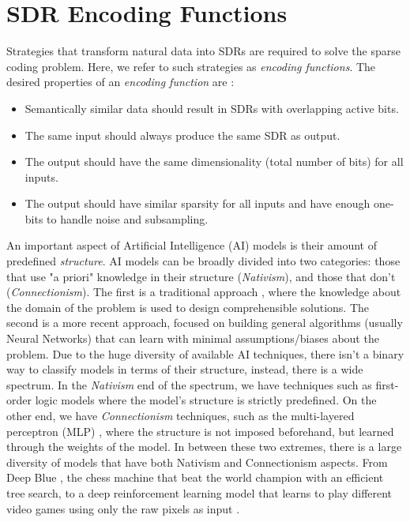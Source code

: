 \documentclass{article}
\begin{document}
\section{SDR Encoding Functions}
\label{SDRgen}

Strategies that transform natural data into SDRs are required to solve the sparse
coding problem. Here, we refer to such strategies as \textit{encoding functions}.
The desired properties of an \textit{encoding function} are \cite{Hawkins-et-al-2016-Book}:
\begin{itemize}
    \item Semantically similar data should result in SDRs with overlapping active bits.
    \item The same input should always produce the same SDR as output.
    \item The output should have the same dimensionality (total number of bits) for all inputs.
    \item The output should have similar sparsity for all inputs and have enough one-bits to handle noise and subsampling.
\end{itemize}

An important aspect of Artificial Intelligence (AI) models is their amount of predefined \textit{structure}. AI models can be broadly divided into two categories: those that use "a priori" knowledge in their structure (\textit{Nativism}), and those that don't (\textit{Connectionism}).
The first is a traditional approach \cite{newell2007computer}, where the knowledge about the domain of the problem is used to design comprehensible solutions.
The second is a more recent approach, focused on building general algorithms (usually Neural Networks) that can learn with minimal assumptions/biases about the problem.
Due to the huge diversity of available AI techniques, there isn't a binary way to classify models in terms of their structure, instead, there is a wide spectrum.
In the \textit{Nativism} end of the spectrum, we have techniques such as first-order logic models \cite{mitchell1997machine} where the model's structure is strictly predefined.
On the other end, we have \textit{Connectionism} techniques, such as the multi-layered perceptron (MLP) \cite{hornik1989multilayer}, where the structure is not imposed beforehand, but learned through the weights of the model.
In between these two extremes, there is a large diversity of models that have both Nativism and Connectionism aspects. From Deep Blue \cite{campbell2002deep}, the chess machine that beat the world champion with an efficient tree search, to a deep reinforcement learning model that learns to play different video games using only the raw pixels as input  \cite{mnih2015human}.
\end{document}
